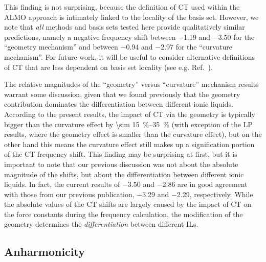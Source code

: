 \documentclass[%
  class = book,%
  crop = false,%
  float = true,%
  multi = true,%
  preview = false,%
]{standalone}
\begin{document}
This finding is not surprising, because the definition of CT used within the ALMO approach is intimately linked to the locality of the basis set. However, we note that \emph{all} methods and basis sets tested here provide qualitatively similar predictions, namely a negative frequency shift between \num{-1.19} and \SI{-3.50}{\wavenumber} for the ``geometry mechanism'' and between \num{-0.94} and \SI{-2.97}{\wavenumber} for the ``curvature mechanism''. For future work, it will be useful to consider alternative definitions of CT that are less dependent on basis set locality (see e.g. Ref.~\parencite{Lao2016a}).

The relative magnitudes of the ``geometry'' versus ``curvature'' mechanism results warrant some discussion, given that we found previously that the geometry contribution dominates the differentiation between different ionic liquids. According to the present results, the impact of CT via the geometry is typically bigger than the curvature effect by \SIrange{\sim 15}{35}{\percent} (with exception of the LP results, where the geometry effect is smaller than the curvature effect), but on the other hand this means the curvature effect still makes up a signification portion of the CT frequency shift. This finding may be surprising at first, but it is important to note that our previous discussion was not about the absolute magnitude of the shifts, but about the differentiation between different ionic liquids. In fact, the current results of \num{-3.50} and \SI{-2.86}{\wavenumber} are in good agreement with those from our previous publication, \SI{-3.29}{\wavenumber} and \SI{-2.29}{\wavenumber}, respectively. While the absolute values of the CT shifts are largely caused by the impact of CT on the force constants during the frequency calculation, the modification of the geometry determines the \emph{differentiation} between different ILs.

\subsection{Anharmonicity}
\label{paper_02:ssec:IIIB}
\end{document}
